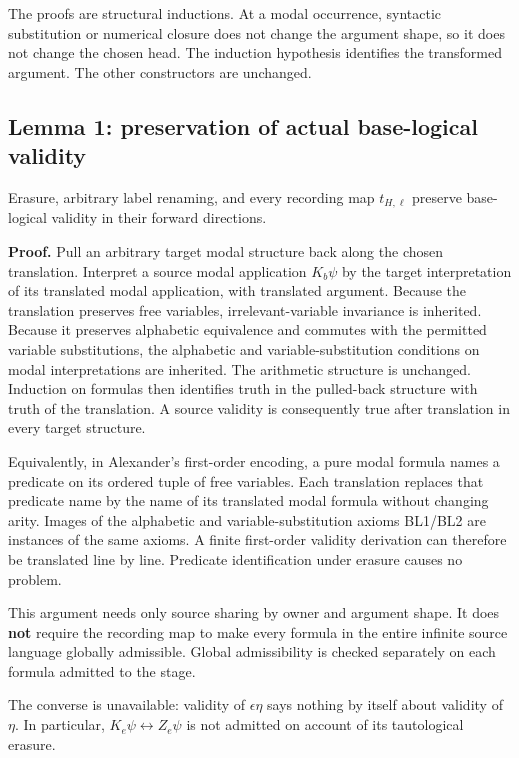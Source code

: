 \documentclass[
  11pt,
  letterpaper,
]{article}
\begin{document}
The proofs are structural inductions. At a modal occurrence, syntactic
substitution or numerical closure does not change the argument shape, so
it does not change the chosen head. The induction hypothesis identifies
the transformed argument. The other constructors are unchanged.

\subsection{Lemma 1: preservation of actual base-logical
validity}\label{lemma-1-preservation-of-actual-base-logical-validity}

Erasure, arbitrary label renaming, and every recording map
\(t_{H,\ell}\) preserve base-logical validity in their forward
directions.

\textbf{Proof.} Pull an arbitrary target modal structure back along the
chosen translation. Interpret a source modal application \(K_b\psi\) by
the target interpretation of its translated modal application, with
translated argument. Because the translation preserves free variables,
irrelevant-variable invariance is inherited. Because it preserves
alphabetic equivalence and commutes with the permitted variable
substitutions, the alphabetic and variable-substitution conditions on
modal interpretations are inherited. The arithmetic structure is
unchanged. Induction on formulas then identifies truth in the
pulled-back structure with truth of the translation. A source validity
is consequently true after translation in every target structure.

Equivalently, in Alexander's first-order encoding, a pure modal formula
names a predicate on its ordered tuple of free variables. Each
translation replaces that predicate name by the name of its translated
modal formula without changing arity. Images of the alphabetic and
variable-substitution axioms BL1/BL2 are instances of the same axioms. A
finite first-order validity derivation can therefore be translated line
by line. Predicate identification under erasure causes no problem.

This argument needs only source sharing by owner and argument shape. It
does \textbf{not} require the recording map to make every formula in the
entire infinite source language globally admissible. Global
admissibility is checked separately on each formula admitted to the
stage.

The converse is unavailable: validity of \(\epsilon\eta\) says nothing
by itself about validity of \(\eta\). In particular,
\(K_e\psi\leftrightarrow Z_e\psi\) is not admitted on account of its
tautological erasure.
\end{document}
